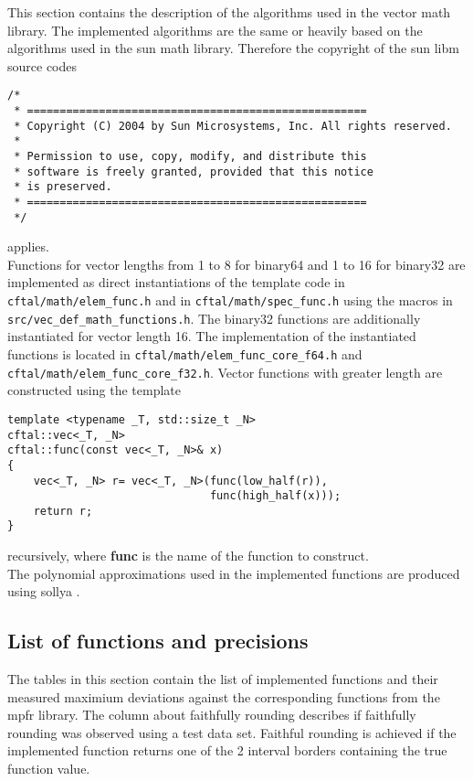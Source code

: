 \documentclass[10pt,a4paper,final,oneside]{article}
\numberwithin{equation}{subsection}
\begin{document}
This section contains the description of the algorithms used in the
vector math library. The implemented algorithms are the same or
heavily based on the algorithms used in the sun math
library. Therefore the copyright of the sun libm source codes
\small
\begin{verbatim}
/*
 * ====================================================
 * Copyright (C) 2004 by Sun Microsystems, Inc. All rights reserved.
 *
 * Permission to use, copy, modify, and distribute this
 * software is freely granted, provided that this notice
 * is preserved.
 * ====================================================
 */
\end{verbatim}
\normalsize
applies.\\[10pt]
%
Functions for vector lengths from 1 to 8 for binary64 and
1 to 16 for binary32 are implemented as direct instantiations of
the template code in
\lstinline{cftal/math/elem_func.h}
and in \lstinline{cftal/math/spec_func.h}
using the macros in
\lstinline{src/vec_def_math_functions.h}.
The binary32 functions are additionally instantiated for vector length 16.
The implementation of the instantiated functions is located in
\lstinline{cftal/math/elem_func_core_f64.h} and
\lstinline{cftal/math/elem_func_core_f32.h}.
Vector functions with greater length are constructed using the template
\begin{lstlisting}
template <typename _T, std::size_t _N>
cftal::vec<_T, _N>
cftal::func(const vec<_T, _N>& x)
{
    vec<_T, _N> r= vec<_T, _N>(func(low_half(r)),
                               func(high_half(x)));
    return r;
}
\end{lstlisting}
recursively, where \textbf{func} is the name of the
function to construct.\\[10pt]
The polynomial approximations used in the implemented functions
are produced using sollya \cite{ChevillardJoldesLauter2010}.

\subsection{List of functions and precisions}
\label{sub_sec:func_list}
The tables in this section contain the list of implemented functions and
their measured maximium deviations against the corresponding functions
from the mpfr library.
The column about faithfully rounding describes if faithfully rounding
was observed using a test data set.
Faithful rounding is achieved if the implemented function returns
one of the 2 interval borders containing the true function value.
\end{document}
